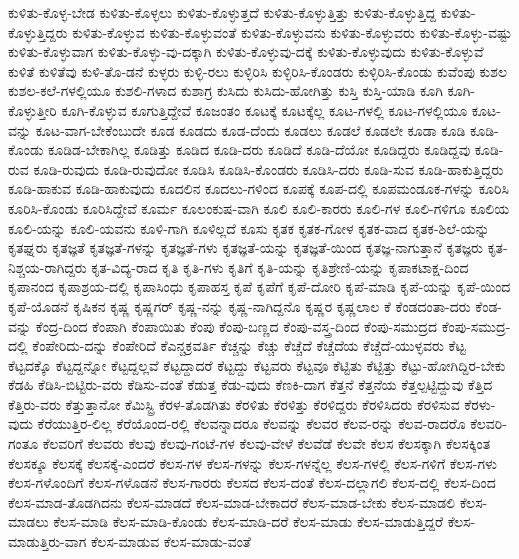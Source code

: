 {ಕುಳಿತು-ಕೊಳ್ಳ-ಬೇಡ
ಕುಳಿತು-ಕೊಳ್ಳಲು
ಕುಳಿತು-ಕೊಳ್ಳುತ್ತದೆ
ಕುಳಿತು-ಕೊಳ್ಳುತ್ತಿತ್ತು
ಕುಳಿತು-ಕೊಳ್ಳುತ್ತಿದ್ದ
ಕುಳಿತು-ಕೊಳ್ಳುತ್ತಿದ್ದರು
ಕುಳಿತು-ಕೊಳ್ಳುವ
ಕುಳಿತು-ಕೊಳ್ಳುವಂತೆ
ಕುಳಿತು-ಕೊಳ್ಳುವನು
ಕುಳಿತು-ಕೊಳ್ಳುವರು
ಕುಳಿತು-ಕೊಳ್ಳು-ವಷ್ಟು
ಕುಳಿತು-ಕೊಳ್ಳುವಾಗ
ಕುಳಿತು-ಕೊಳ್ಳು-ವು-ದಕ್ಕಾಗಿ
ಕುಳಿತು-ಕೊಳ್ಳುವು-ದಕ್ಕೆ
ಕುಳಿತು-ಕೊಳ್ಳುವುದು
ಕುಳಿತು-ಕೊಳ್ಳುವೆ
ಕುಳಿತೆ
ಕುಳಿತೆವು
ಕುಳಿ-ತೊ-ಡನೆ
ಕುಳ್ಳರು
ಕುಳ್ಳಿ-ರಲು
ಕುಳ್ಳಿರಿಸಿ
ಕುಳ್ಳಿರಿಸಿ-ಕೊಂಡರು
ಕುಳ್ಳಿರಿಸಿ-ಕೊಂಡು
ಕುವೆಂಪು
ಕುಶಲ
ಕುಶಲ-ಕಲೆ-ಗಳಲ್ಲಿಯೂ
ಕುಶಲಿ-ಗಳಾದ
ಕುಶಾಗ್ರ
ಕುಸಿದು
ಕುಸಿದು-ಹೋಗಿತ್ತು
ಕುಸ್ತಿ
ಕುಸ್ತಿ-ಯಾಡಿ
ಕೂಗಿ
ಕೂಗಿ-ಕೊಳ್ಳುತ್ತೀರಿ
ಕೂಗಿ-ಕೊಳ್ಳುವ
ಕೂಗುತ್ತಿದ್ದೇವೆ
ಕೂಜಂತಂ
ಕೂಟಕ್ಕೆ
ಕೂಟಕ್ಕೆಲ್ಲ
ಕೂಟ-ಗಳಲ್ಲಿ
ಕೂಟ-ಗಳಲ್ಲಿಯೂ
ಕೂಟ-ವನ್ನು
ಕೂಟ-ವಾಗ-ಬೇಕೆಂಬುದೇ
ಕೂಡ
ಕೂಡದು
ಕೂಡ-ದೆಂದು
ಕೂಡಲು
ಕೂಡಲೆ
ಕೂಡಲೇ
ಕೂಡಾ
ಕೂಡಿ
ಕೂಡಿ-ಕೊಂಡು
ಕೂಡಿಡ-ಬೇಕಾಗಿಲ್ಲ
ಕೂಡಿತ್ತು
ಕೂಡಿದ
ಕೂಡಿ-ದರು
ಕೂಡಿದೆ
ಕೂಡಿ-ದೆಯೋ
ಕೂಡಿದ್ದರು
ಕೂಡಿದ್ದವು
ಕೂಡಿ-ರುವ
ಕೂಡಿ-ರುವುದು
ಕೂಡಿ-ರುವುದೋ
ಕೂಡಿಸಿ
ಕೂಡಿಸಿ-ಕೊಂಡರು
ಕೂಡಿಸಿ-ದರು
ಕೂಡಿ-ಸುವ
ಕೂಡಿ-ಹಾಕುತ್ತಿದ್ದರು
ಕೂಡಿ-ಹಾಕುವ
ಕೂಡಿ-ಹಾಕುವುದು
ಕೂದಲಿನ
ಕೂದಲು-ಗಳಿಂದ
ಕೂಪಕ್ಕೆ
ಕೂಪ-ದಲ್ಲಿ
ಕೂಪಮಂಡೂಕ-ಗಳನ್ನು
ಕೂರಿಸಿ
ಕೂರಿಸಿ-ಕೊಂಡು
ಕೂರಿಸಿದ್ದೇವೆ
ಕೂರ್ಮ
ಕೂಲಂಕುಷ-ವಾಗಿ
ಕೂಲಿ
ಕೂಲಿ-ಕಾರರು
ಕೂಲಿ-ಗಳ
ಕೂಲಿ-ಗಳಿಗೂ
ಕೂಲಿಯ
ಕೂಲಿ-ಯನ್ನು
ಕೂಲಿ-ಯವನು
ಕೂಳಿ-ಗಾಗಿ
ಕೂಳಿಲ್ಲದೆ
ಕೂಸು
ಕೃತಕ
ಕೃತಕ-ಗೋಳ
ಕೃತಕ-ವಾದ
ಕೃತಕ-ಶಿಲೆ-ಯನ್ನು
ಕೃತಘ್ನರು
ಕೃತಜ್ಞತೆ
ಕೃತಜ್ಞತೆ-ಗಳನ್ನು
ಕೃತಜ್ಞತೆ-ಗಳು
ಕೃತಜ್ಞತೆ-ಯನ್ನು
ಕೃತಜ್ಞತೆ-ಯಿಂದ
ಕೃತಜ್ಞ-ನಾಗುತ್ತಾನೆ
ಕೃತಜ್ಞರು
ಕೃತ-ನಿಶ್ಚಯ-ರಾಗಿದ್ದರು
ಕೃತ-ವಿದ್ಯ-ರಾದ
ಕೃತಿ
ಕೃತಿ-ಗಳು
ಕೃತಿಗೆ
ಕೃತಿ-ಯನ್ನು
ಕೃತಿಶ್ರೇಣಿ-ಯನ್ನು
ಕೃಪಾಕಟಾಕ್ಷ-ದಿಂದ
ಕೃಪಾನಂದ
ಕೃಪಾಶ್ರಯ-ದಲ್ಲಿ
ಕೃಪಾಸಿಂಧು
ಕೃಪಾಹಸ್ತ
ಕೃಪೆ
ಕೃಪೆಗೆ
ಕೃಪೆ-ದೋರಿ
ಕೃಪೆ-ಮಾಡಿ
ಕೃಪೆ-ಯನ್ನು
ಕೃಪೆ-ಯಿಂದ
ಕೃಪೆ-ಯೊಡನೆ
ಕೃಷಿಕನ
ಕೃಷ್ಣ
ಕೃಷ್ಣಗರ್
ಕೃಷ್ಣ-ನನ್ನು
ಕೃಷ್ಣ-ನಾಗಿದ್ದನೊ
ಕೃಷ್ಣರ
ಕೃಷ್ಣಲಾಲ
ಕೆ
ಕೆಂಡದಂತಾ-ದರು
ಕೆಂಡ-ವನ್ನು
ಕೆಂದ್ರ-ದಿಂದ
ಕೆಂಪಾಗಿ
ಕೆಂಪಾಯಿತು
ಕೆಂಪು
ಕೆಂಪು-ಬಣ್ಣದ
ಕೆಂಪು-ವಸ್ತ್ರ-ದಿಂದ
ಕೆಂಪು-ಸಮುದ್ರದ
ಕೆಂಪು-ಸಮುದ್ರ-ದಲ್ಲಿ
ಕೆಂಪೇರಿದು-ದನ್ನು
ಕೆಂಪೇರಿದೆ
ಕೆಎನ್ಚಕ್ರವರ್ತಿ
ಕೆಚ್ಚನ್ನು
ಕೆಚ್ಚು
ಕೆಚ್ಚೆದೆ
ಕೆಚ್ಚೆದೆಯ
ಕೆಚ್ಚೆದೆ-ಯುಳ್ಳವರು
ಕೆಟ್ಟ
ಕೆಟ್ಟದಕ್ಕೊ
ಕೆಟ್ಟದ್ದನ್ನೋ
ಕೆಟ್ಟದ್ದಲ್ಲವೆ
ಕೆಟ್ಟದ್ದಾದರೆ
ಕೆಟ್ಟದ್ದು
ಕೆಟ್ಟವರು
ಕೆಟ್ಟವೂ
ಕೆಟ್ಟಿತು
ಕೆಟ್ಟಿತ್ತು
ಕೆಟ್ಟು-ಹೋಗಿದ್ದಿರ-ಬೇಕು
ಕೆಡಹಿ
ಕೆಡಿಸಿ-ಬಿಟ್ಟಿರು-ವರು
ಕೆಡಿಸು-ವಂತೆ
ಕೆಡುತ್ತ
ಕೆಡು-ವುದು
ಕೆಣಕಿ-ದಾಗ
ಕೆತ್ತನೆ
ಕೆತ್ತನೆಯ
ಕೆತ್ತಲ್ಪಟ್ಟಿದ್ದುವು
ಕೆತ್ತಿದ
ಕೆತ್ತಿರು-ವರು
ಕೆತ್ತುತ್ತಾನೋ
ಕೆಮಿಸ್ಟ್ರಿ
ಕೆರಳ-ತೊಡಗಿತು
ಕೆರಳಿತು
ಕೆರಳಿತ್ತು
ಕೆರಳಿದ್ದರು
ಕೆರಳಿಸಿದರು
ಕೆರಳಿಸುವ
ಕೆರಳು-ವುದು
ಕೆರೆಯುತ್ತಿರ-ಲಿಲ್ಲ
ಕೆರೆಯೊಂದ-ರಲ್ಲಿ
ಕೆಲವನ್ನಾದರೂ
ಕೆಲವನ್ನು
ಕೆಲವರ
ಕೆಲವ-ರನ್ನು
ಕೆಲವ-ರಾದರೊ
ಕೆಲವರಿ-ಗಂತೂ
ಕೆಲವರಿಗೆ
ಕೆಲವರು
ಕೆಲವು
ಕೆಲವು-ಗಂಟೆ-ಗಳ
ಕೆಲವು-ವೇಳೆ
ಕೆಲವೆಡೆ
ಕೆಲವೇ
ಕೆಲಸ
ಕೆಲಸಕ್ಕಾಗಿ
ಕೆಲಸಕ್ಕಿಂತ
ಕೆಲಸಕ್ಕೂ
ಕೆಲಸಕ್ಕೆ
ಕೆಲಸಕ್ಕೆ-ಎಂದರೆ
ಕೆಲಸ-ಗಳ
ಕೆಲಸ-ಗಳನ್ನು
ಕೆಲಸ-ಗಳನ್ನೆಲ್ಲ
ಕೆಲಸ-ಗಳಲ್ಲಿ
ಕೆಲಸ-ಗಳಿಗೆ
ಕೆಲಸ-ಗಳು
ಕೆಲಸ-ಗಳೊಂದಿಗೆ
ಕೆಲಸ-ಗಳೊಡನೆ
ಕೆಲಸ-ಗಾರರು
ಕೆಲಸದ
ಕೆಲಸ-ದಂತೆ
ಕೆಲಸ-ದಲ್ಲಾಗಲಿ
ಕೆಲಸ-ದಲ್ಲಿ
ಕೆಲಸ-ದಿಂದ
ಕೆಲಸ-ಮಾಡ-ತೊಡಗಿದನು
ಕೆಲಸ-ಮಾಡದೆ
ಕೆಲಸ-ಮಾಡ-ಬೇಕಾದರೆ
ಕೆಲಸ-ಮಾಡ-ಬೇಕು
ಕೆಲಸ-ಮಾಡಲಿ
ಕೆಲಸ-ಮಾಡಲು
ಕೆಲಸ-ಮಾಡಿ
ಕೆಲಸ-ಮಾಡಿ-ಕೊಂಡು
ಕೆಲಸ-ಮಾಡಿ-ದರೆ
ಕೆಲಸ-ಮಾಡು
ಕೆಲಸ-ಮಾಡುತ್ತಿದ್ದರೆ
ಕೆಲಸ-ಮಾಡುತ್ತಿರು-ವಾಗ
ಕೆಲಸ-ಮಾಡುವ
ಕೆಲಸ-ಮಾಡು-ವಂತೆ
}
